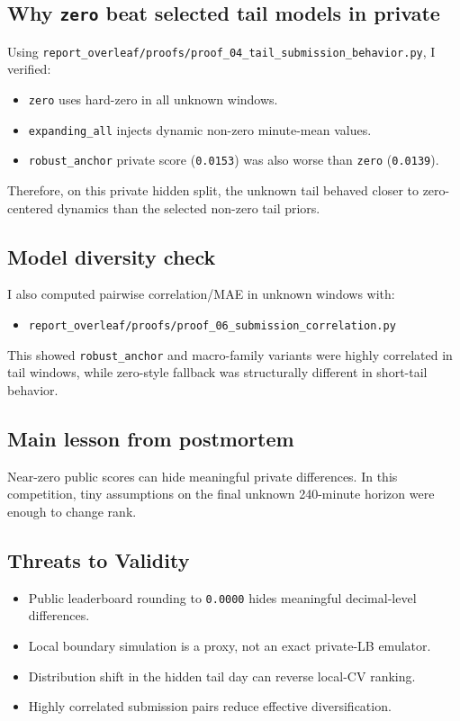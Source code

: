 \subsection{Why \texttt{zero} beat selected tail models in private}
Using \texttt{report\_overleaf/proofs/proof\_04\_tail\_submission\_behavior.py}, I verified:
\begin{itemize}[leftmargin=1.5em]
  \item \texttt{zero} uses hard-zero in all unknown windows.
  \item \texttt{expanding\_all} injects dynamic non-zero minute-mean values.
  \item \texttt{robust\_anchor} private score (\texttt{0.0153}) was also worse than \texttt{zero} (\texttt{0.0139}).
\end{itemize}

Therefore, on this private hidden split, the unknown tail behaved closer to zero-centered dynamics than the selected non-zero tail priors.

\subsection{Model diversity check}
I also computed pairwise correlation/MAE in unknown windows with:
\begin{itemize}[leftmargin=1.5em]
  \item \texttt{report\_overleaf/proofs/proof\_06\_submission\_correlation.py}
\end{itemize}
This showed \texttt{robust\_anchor} and macro-family variants were highly correlated in tail windows, while zero-style fallback was structurally different in short-tail behavior.

\subsection{Main lesson from postmortem}
Near-zero public scores can hide meaningful private differences. In this competition, tiny assumptions on the final unknown 240-minute horizon were enough to change rank.

\subsection{Threats to Validity}
\begin{itemize}[leftmargin=1.5em]
  \item Public leaderboard rounding to \texttt{0.0000} hides meaningful decimal-level differences.
  \item Local boundary simulation is a proxy, not an exact private-LB emulator.
  \item Distribution shift in the hidden tail day can reverse local-CV ranking.
  \item Highly correlated submission pairs reduce effective diversification.
\end{itemize}
